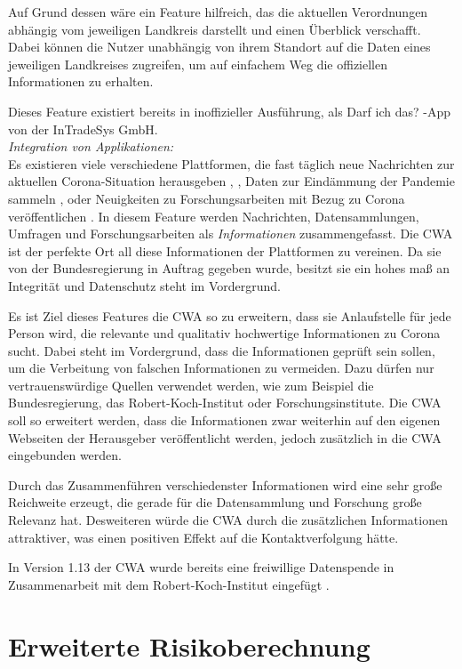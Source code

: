 \documentclass[conference]{IEEEtran}
\begin{document}
Auf Grund dessen wäre ein Feature hilfreich, das die aktuellen Verordnungen abhängig vom jeweiligen Landkreis darstellt und einen Überblick verschafft.
Dabei können die Nutzer unabhängig von ihrem Standort auf die Daten eines jeweiligen Landkreises zugreifen,
um auf einfachem Weg die offiziellen Informationen zu erhalten. 

Dieses Feature existiert bereits in inoffizieller Ausführung, als \glqq Darf ich das? \grqq{} -App von der InTradeSys GmbH. \cite{DarfIchDas}\\

\textit{Integration von Applikationen:}\\
Es existieren viele verschiedene Plattformen, die fast täglich neue Nachrichten zur aktuellen Corona-Situation herausgeben \cite{RKI}, \cite{BMG}, Daten zur Eindämmung der Pandemie sammeln \cite{RKIDatenspende}, \cite{Gedaechtnistest} oder Neuigkeiten zu Forschungsarbeiten mit Bezug zu Corona veröffentlichen \cite{GesundheitsforschungNews}.
In diesem Feature werden Nachrichten, Datensammlungen, Umfragen und Forschungsarbeiten als \textit{Informationen} zusammengefasst.
Die CWA ist der perfekte Ort all diese Informationen der Plattformen zu vereinen. 
Da sie von der Bundesregierung in Auftrag gegeben wurde, besitzt sie ein hohes maß an Integrität und Datenschutz steht im Vordergrund.

Es ist Ziel dieses Features die CWA so zu erweitern, dass sie Anlaufstelle für jede Person wird, die relevante und qualitativ hochwertige Informationen zu Corona sucht.
Dabei steht im Vordergrund, dass die Informationen geprüft sein sollen, um die Verbeitung von falschen Informationen zu vermeiden. 
Dazu dürfen nur vertrauenswürdige Quellen verwendet werden, wie zum Beispiel die Bundesregierung, das Robert-Koch-Institut oder Forschungsinstitute. 
Die CWA soll so erweitert werden, dass die Informationen zwar weiterhin auf den eigenen Webseiten der Herausgeber veröffentlicht werden, jedoch zusätzlich in die CWA eingebunden werden.

Durch das Zusammenführen verschiedenster Informationen wird eine sehr große Reichweite erzeugt, die gerade für die Datensammlung und Forschung große Relevanz hat.
Desweiteren würde die CWA durch die zusätzlichen Informationen attraktiver, was einen positiven Effekt auf die Kontaktverfolgung hätte.

In Version 1.13 der CWA wurde bereits eine freiwillige Datenspende in Zusammenarbeit mit dem Robert-Koch-Institut eingefügt \cite{freiwilligeDatenspende}. 
\section{Erweiterte Risikoberechnung} \label{Erweiterte Risikoberechnung}
\end{document}
